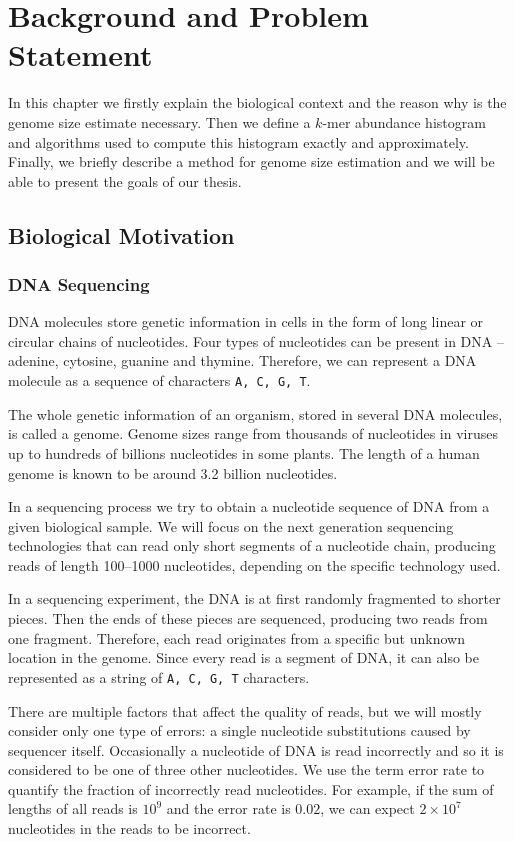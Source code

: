 \chapter{Background and Problem Statement}
In this chapter we firstly explain the biological context and the reason why is 
the genome size estimate necessary. Then we define a $k$-mer abundance histogram
and algorithms used to compute this histogram exactly and approximately.
Finally, we briefly describe a method for genome size estimation and we will be
able to present the goals of our thesis.

\section{Biological Motivation}

\subsection{DNA Sequencing}
\label{sec:sequencing}

DNA molecules store genetic information in cells in the form of long linear or circular chains
of nucleotides. Four types of nucleotides can be present in DNA -- adenine, cytosine, guanine
and thymine. Therefore, we can represent a DNA molecule as a sequence of characters
\texttt{A, C, G, T}.

The whole genetic information of an organism, stored in several DNA molecules, is called a genome.
Genome sizes range from thousands of nucleotides in viruses up to hundreds of billions
nucleotides in some plants. The length of a human genome is known to be around
3.2 billion nucleotides.

In a sequencing process we try to obtain a nucleotide sequence of DNA from
a given biological sample. We will focus on the next generation sequencing technologies
that can read only short segments of a nucleotide chain, producing reads of length 100--1000
nucleotides, depending on the specific technology used.

In a sequencing experiment, the DNA is at first randomly fragmented to shorter pieces.
Then the ends of these pieces are sequenced, producing two reads from one fragment. 
Therefore, each read originates from a specific but unknown location in the genome. 
Since every read is a segment of DNA, it can also be represented as a string of
\texttt{A, C, G, T} characters.

There are multiple factors that affect the quality of reads, but we will mostly consider only
one type of errors: a single nucleotide substitutions caused by sequencer itself. Occasionally
a nucleotide of DNA is read incorrectly and so it is considered to be one of three
other nucleotides. We use the term error rate to quantify the fraction of incorrectly
read nucleotides. For example, if the sum of lengths of all reads is $10^9$ and the error
rate is $0.02$, we can expect $2 \times 10^7$ nucleotides in the reads to be incorrect.

